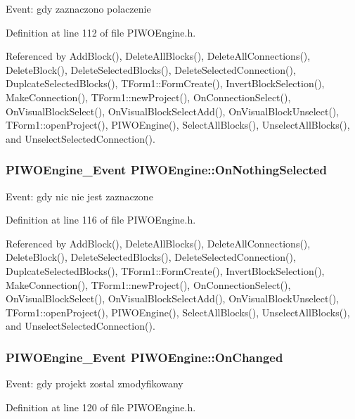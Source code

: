 Event: gdy zaznaczono polaczenie 

Definition at line 112 of file PIWOEngine.h.

Referenced by AddBlock(), DeleteAllBlocks(), DeleteAllConnections(), DeleteBlock(), DeleteSelectedBlocks(), DeleteSelectedConnection(), DuplcateSelectedBlocks(), TForm1::FormCreate(), InvertBlockSelection(), MakeConnection(), TForm1::newProject(), OnConnectionSelect(), OnVisualBlockSelect(), OnVisualBlockSelectAdd(), OnVisualBlockUnselect(), TForm1::openProject(), PIWOEngine(), SelectAllBlocks(), UnselectAllBlocks(), and UnselectSelectedConnection().\hypertarget{classPIWOEngine_df70bc69dc41278c1d2b02f308a1ba20}{
\subsubsection[OnNothingSelected]{\setlength{\rightskip}{0pt plus 5cm}PIWOEngine\_\-Event {\bf PIWOEngine::OnNothingSelected}}}
\label{classPIWOEngine_df70bc69dc41278c1d2b02f308a1ba20}


Event: gdy nic nie jest zaznaczone 

Definition at line 116 of file PIWOEngine.h.

Referenced by AddBlock(), DeleteAllBlocks(), DeleteAllConnections(), DeleteBlock(), DeleteSelectedBlocks(), DeleteSelectedConnection(), DuplcateSelectedBlocks(), TForm1::FormCreate(), InvertBlockSelection(), MakeConnection(), TForm1::newProject(), OnConnectionSelect(), OnVisualBlockSelect(), OnVisualBlockSelectAdd(), OnVisualBlockUnselect(), TForm1::openProject(), PIWOEngine(), SelectAllBlocks(), UnselectAllBlocks(), and UnselectSelectedConnection().\hypertarget{classPIWOEngine_5322d9b9def723ae036b005c5a3c578e}{
\subsubsection[OnChanged]{\setlength{\rightskip}{0pt plus 5cm}PIWOEngine\_\-Event {\bf PIWOEngine::OnChanged}}}
\label{classPIWOEngine_5322d9b9def723ae036b005c5a3c578e}


Event: gdy projekt zostal zmodyfikowany 

Definition at line 120 of file PIWOEngine.h.

